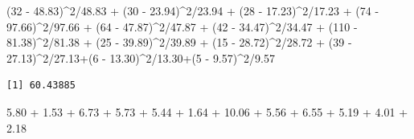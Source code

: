 \documentclass[
]{book}
\newenvironment{Shaded}{\begin{snugshade}}{\end{snugshade}}
\newcommand{\DecValTok}[1]{\textcolor[rgb]{0.00,0.00,0.81}{#1}}
\newcommand{\FloatTok}[1]{\textcolor[rgb]{0.00,0.00,0.81}{#1}}
\newcommand{\NormalTok}[1]{#1}
\newcommand{\SpecialCharTok}[1]{\textcolor[rgb]{0.00,0.00,0.00}{#1}}
\begin{document}
\begin{Shaded}
\begin{Highlighting}[]
\NormalTok{(}\DecValTok{32} \SpecialCharTok{{-}} \FloatTok{48.83}\NormalTok{)}\SpecialCharTok{\^{}}\DecValTok{2}\SpecialCharTok{/}\FloatTok{48.83} \SpecialCharTok{+}\NormalTok{ (}\DecValTok{30} \SpecialCharTok{{-}} \FloatTok{23.94}\NormalTok{)}\SpecialCharTok{\^{}}\DecValTok{2}\SpecialCharTok{/}\FloatTok{23.94} \SpecialCharTok{+}\NormalTok{ (}\DecValTok{28} \SpecialCharTok{{-}} \FloatTok{17.23}\NormalTok{)}\SpecialCharTok{\^{}}\DecValTok{2}\SpecialCharTok{/}\FloatTok{17.23} \SpecialCharTok{+}\NormalTok{ (}\DecValTok{74} \SpecialCharTok{{-}} \FloatTok{97.66}\NormalTok{)}\SpecialCharTok{\^{}}\DecValTok{2}\SpecialCharTok{/}\FloatTok{97.66} \SpecialCharTok{+}\NormalTok{ (}\DecValTok{64} \SpecialCharTok{{-}} \FloatTok{47.87}\NormalTok{)}\SpecialCharTok{\^{}}\DecValTok{2}\SpecialCharTok{/}\FloatTok{47.87} \SpecialCharTok{+}\NormalTok{ (}\DecValTok{42} \SpecialCharTok{{-}} \FloatTok{34.47}\NormalTok{)}\SpecialCharTok{\^{}}\DecValTok{2}\SpecialCharTok{/}\FloatTok{34.47} \SpecialCharTok{+}\NormalTok{ (}\DecValTok{110} \SpecialCharTok{{-}} \FloatTok{81.38}\NormalTok{)}\SpecialCharTok{\^{}}\DecValTok{2}\SpecialCharTok{/}\FloatTok{81.38} \SpecialCharTok{+}\NormalTok{ (}\DecValTok{25} \SpecialCharTok{{-}} \FloatTok{39.89}\NormalTok{)}\SpecialCharTok{\^{}}\DecValTok{2}\SpecialCharTok{/}\FloatTok{39.89} \SpecialCharTok{+}\NormalTok{ (}\DecValTok{15} \SpecialCharTok{{-}} \FloatTok{28.72}\NormalTok{)}\SpecialCharTok{\^{}}\DecValTok{2}\SpecialCharTok{/}\FloatTok{28.72} \SpecialCharTok{+}\NormalTok{ (}\DecValTok{39} \SpecialCharTok{{-}} \FloatTok{27.13}\NormalTok{)}\SpecialCharTok{\^{}}\DecValTok{2}\SpecialCharTok{/}\FloatTok{27.13}\SpecialCharTok{+}\NormalTok{(}\DecValTok{6} \SpecialCharTok{{-}} \FloatTok{13.30}\NormalTok{)}\SpecialCharTok{\^{}}\DecValTok{2}\SpecialCharTok{/}\FloatTok{13.30}\SpecialCharTok{+}\NormalTok{(}\DecValTok{5} \SpecialCharTok{{-}} \FloatTok{9.57}\NormalTok{)}\SpecialCharTok{\^{}}\DecValTok{2}\SpecialCharTok{/}\FloatTok{9.57}
\end{Highlighting}
\end{Shaded}

\begin{verbatim}
[1] 60.43885
\end{verbatim}

\begin{Shaded}
\begin{Highlighting}[]
\FloatTok{5.80} \SpecialCharTok{+} \FloatTok{1.53} \SpecialCharTok{+} \FloatTok{6.73} \SpecialCharTok{+} \FloatTok{5.73} \SpecialCharTok{+} \FloatTok{5.44} \SpecialCharTok{+} \FloatTok{1.64} \SpecialCharTok{+} \FloatTok{10.06} \SpecialCharTok{+} \FloatTok{5.56} \SpecialCharTok{+} \FloatTok{6.55} \SpecialCharTok{+} \FloatTok{5.19} \SpecialCharTok{+} \FloatTok{4.01} \SpecialCharTok{+} \FloatTok{2.18}
\end{Highlighting}
\end{Shaded}
\end{document}
